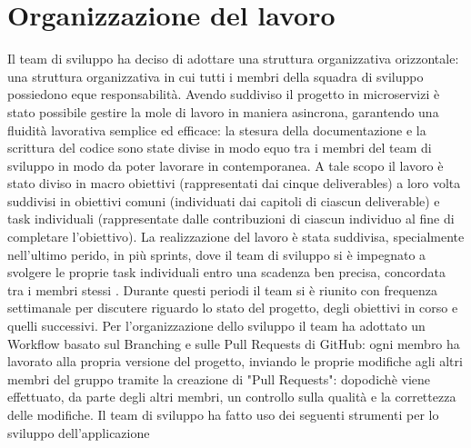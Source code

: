 \documentclass{report}
\begin{document}
\section{Organizzazione del lavoro}

Il team di sviluppo ha deciso di adottare una struttura organizzativa orizzontale: una struttura organizzativa in cui tutti i membri della squadra di sviluppo possiedono eque responsabilità.
Avendo suddiviso il progetto in microservizi è stato possibile gestire la mole di lavoro in maniera asincrona, garantendo una fluidità lavorativa semplice ed efficace: la stesura della documentazione e la scrittura del codice sono state divise in modo equo tra i membri del team di sviluppo
in modo da poter lavorare in contemporanea.
A tale scopo il lavoro è stato diviso in macro obiettivi (rappresentati dai cinque deliverables) a loro volta suddivisi in obiettivi comuni (individuati dai capitoli di ciascun deliverable) e task individuali (rappresentate dalle contribuzioni di ciascun individuo al fine di completare l'obiettivo).
La realizzazione del lavoro è stata suddivisa, specialmente nell'ultimo perido, in più sprints, dove il team di sviluppo si è impegnato a svolgere le proprie task individuali entro una scadenza ben precisa, concordata tra i membri stessi . Durante questi periodi il team si è riunito con frequenza settimanale per discutere riguardo lo stato del progetto, degli obiettivi in corso e quelli successivi.
Per l'organizzazione dello sviluppo il team ha adottato un Workflow basato sul Branching e sulle Pull Requests di GitHub: ogni membro ha lavorato alla propria versione del progetto, inviando le proprie modifiche agli altri membri del gruppo tramite la creazione di "Pull Requests": dopodichè viene effettuato, da parte degli altri membri, un controllo sulla qualità e la correttezza delle modifiche.
Il team di sviluppo ha fatto uso dei seguenti strumenti per lo sviluppo dell'applicazione
\end{document}
